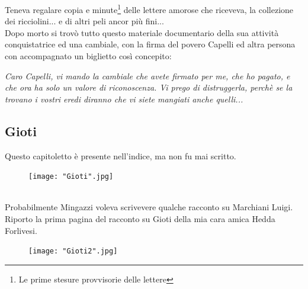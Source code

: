 \documentclass[10pt]{memoir} %
\begin{document}
\newpage
Teneva regalare copia e minute\footnote{Le prime stesure provvisorie delle lettere} delle lettere amorose che riceveva, la collezione dei ricciolini... e di altri peli ancor più fini...\\
Dopo morto si trovò tutto questo materiale documentario della sua attività conquistatrice ed una cambiale, con la firma del povero Capelli ed altra persona con accompagnato un biglietto così concepito:
\begin{center}
	\emph{Caro Capelli, vi mando la cambiale che avete firmato per me, che ho pagato, e che ora ha solo un valore di riconoscenza. Vi prego di distruggerla, perchè se la trovano i vostri eredi diranno che vi siete mangiati anche quelli...}
\end{center}
\:
\:
\subsection{Gioti}
Questo capitoletto è presente nell'indice, ma non fu mai scritto.\\
\begin{figure}[!htbp]
   \texttt{[image: "Gioti".jpg]}
\end{figure}
\\Probabilmente Mingazzi voleva scrivevere qualche racconto su Marchiani Luigi. Riporto la prima pagina del racconto su Gioti della mia cara amica Hedda Forlivesi.\\
\begin{figure}[H]
\begin{center}
   \texttt{[image: "Gioti2".jpg]}\\
  \end{center}
\end{figure}


\end{document}
